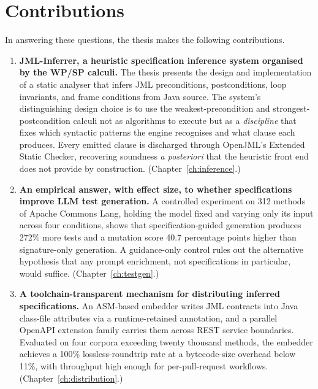 \section{Contributions}

In answering these questions, the thesis makes the following contributions.

\begin{enumerate}
  \item \textbf{JML-Inferrer, a heuristic specification inference system
        organised by the WP/SP calculi.} The thesis presents the design and
        implementation of a static analyser that infers JML preconditions,
        postconditions, loop invariants, and frame conditions from Java
        source. The system's distinguishing design choice is to use the
        weakest-precondition and strongest-postcondition calculi not as
        algorithms to execute but as a \emph{discipline} that fixes which
        syntactic patterns the engine recognises and what clause each
        produces. Every emitted clause is discharged through OpenJML's
        Extended Static Checker, recovering soundness \emph{a posteriori} that
        the heuristic front end does not provide by construction.
        (Chapter~\ref{ch:inference}.)

  \item \textbf{An empirical answer, with effect size, to whether
        specifications improve LLM test generation.} A controlled experiment
        on 312 methods of Apache Commons Lang, holding the model fixed and
        varying only its input across four conditions, shows that
        specification-guided generation produces 272\% more tests and a
        mutation score 40.7 percentage points higher than signature-only
        generation. A guidance-only control rules out the alternative
        hypothesis that any prompt enrichment, not specifications in
        particular, would suffice. (Chapter~\ref{ch:testgen}.)

  \item \textbf{A toolchain-transparent mechanism for distributing inferred
        specifications.} An ASM-based embedder writes JML contracts into Java
        class-file attributes via a runtime-retained annotation, and a
        parallel OpenAPI extension family carries them across REST service
        boundaries. Evaluated on four corpora exceeding twenty thousand
        methods, the embedder achieves a 100\% lossless-roundtrip rate at a
        bytecode-size overhead below 11\%, with throughput high enough for
        per-pull-request workflows. (Chapter~\ref{ch:distribution}.)


\end{enumerate}
